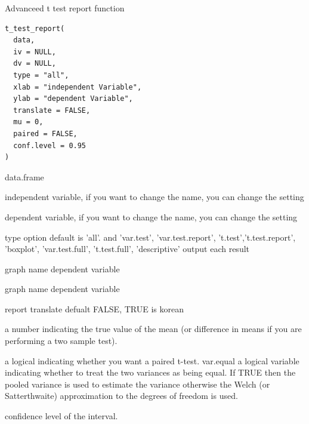 \documentclass[a4paper]{book}
\begin{document}
%
\begin{Description}
Advanceed t test report function
\end{Description}
%
\begin{Usage}
\begin{verbatim}
t_test_report(
  data,
  iv = NULL,
  dv = NULL,
  type = "all",
  xlab = "independent Variable",
  ylab = "dependent Variable",
  translate = FALSE,
  mu = 0,
  paired = FALSE,
  conf.level = 0.95
)
\end{verbatim}
\end{Usage}
%
\begin{Arguments}
\begin{ldescription}
\item[\code{data}] data.frame

\item[\code{iv}] independent variable, if you want to change the name, you can change the setting

\item[\code{dv}] dependent variable, if you want to change the name, you can change the setting

\item[\code{type}] type option default is 'all'. and  'var.test', 'var.test.report', 't.test','t.test.report', 'boxplot', 'var.test.full', 't.test.full', 'descriptive' output each result

\item[\code{xlab}] graph name dependent variable

\item[\code{ylab}] graph name dependent variable

\item[\code{translate}] report translate defualt FALSE, TRUE is korean

\item[\code{mu}] a number indicating the true value of the mean (or difference in means if you are performing a two sample test).

\item[\code{paired}] a logical indicating whether you want a paired t-test.
var.equal a logical variable indicating whether to treat the two variances as being equal. If TRUE then the pooled variance is used to estimate the variance otherwise the Welch (or Satterthwaite) approximation to the degrees of freedom is used.

\item[\code{conf.level}] confidence level of the interval.
\end{ldescription}
\end{Arguments}
\end{document}
